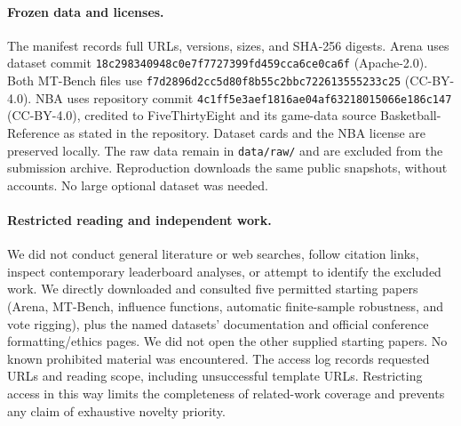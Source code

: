 \documentclass{article}
\begin{document}
\paragraph{Frozen data and licenses.}
The manifest records full URLs, versions, sizes, and SHA-256 digests. Arena uses dataset commit \texttt{18c298340948c0e7f7727399fd459cca6ce0ca6f} (Apache-2.0). Both MT-Bench files use \texttt{f7d2896d2cc5d80f8b55c2bbc722613555233c25} (CC-BY-4.0). NBA uses repository commit \texttt{4c1ff5e3aef1816ae04af63218015066e186c147} (CC-BY-4.0), credited to FiveThirtyEight and its game-data source Basketball-Reference as stated in the repository. Dataset cards and the NBA license are preserved locally. The raw data remain in \texttt{data/raw/} and are excluded from the submission archive. Reproduction downloads the same public snapshots, without accounts. No large optional dataset was needed.

\paragraph{Restricted reading and independent work.}
We did not conduct general literature or web searches, follow citation links, inspect contemporary leaderboard analyses, or attempt to identify the excluded work. We directly downloaded and consulted five permitted starting papers (Arena, MT-Bench, influence functions, automatic finite-sample robustness, and vote rigging), plus the named datasets' documentation and official conference formatting/ethics pages. We did not open the other supplied starting papers. No known prohibited material was encountered. The access log records requested URLs and reading scope, including unsuccessful template URLs. Restricting access in this way limits the completeness of related-work coverage and prevents any claim of exhaustive novelty priority.

\clearpage

\end{document}
